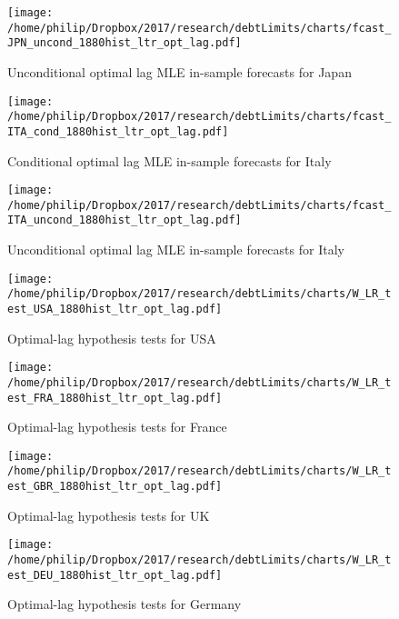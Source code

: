 \documentclass{article}
\begin{document}
	\begin{figure}[htbp]
	    \centering
		\texttt{[image: /home/philip/Dropbox/2017/research/debtLimits/charts/fcast\_JPN\_uncond\_1880hist\_ltr\_opt\_lag.pdf]}
		\caption{Unconditional optimal lag MLE in-sample forecasts for Japan}
	\end{figure}

	\begin{figure}[htbp]
	    \centering
		\texttt{[image: /home/philip/Dropbox/2017/research/debtLimits/charts/fcast\_ITA\_cond\_1880hist\_ltr\_opt\_lag.pdf]}
		\caption{Conditional optimal lag MLE in-sample forecasts for Italy}
	\end{figure}
	
	\begin{figure}[htbp]
	    \centering
		\texttt{[image: /home/philip/Dropbox/2017/research/debtLimits/charts/fcast\_ITA\_uncond\_1880hist\_ltr\_opt\_lag.pdf]}
		\caption{Unconditional optimal lag MLE in-sample forecasts for Italy}
	\end{figure}




	\newpage

	\begin{figure}[htbp]
	    \centering
		\texttt{[image: /home/philip/Dropbox/2017/research/debtLimits/charts/W\_LR\_test\_USA\_1880hist\_ltr\_opt\_lag.pdf]}
		\caption{Optimal-lag hypothesis tests for USA}
	\end{figure}
	
	\begin{figure}[htbp]
	    \centering
		\texttt{[image: /home/philip/Dropbox/2017/research/debtLimits/charts/W\_LR\_test\_FRA\_1880hist\_ltr\_opt\_lag.pdf]}
		\caption{Optimal-lag hypothesis tests for France}
	\end{figure}
	
	\begin{figure}[htbp]
	    \centering
		\texttt{[image: /home/philip/Dropbox/2017/research/debtLimits/charts/W\_LR\_test\_GBR\_1880hist\_ltr\_opt\_lag.pdf]}
		\caption{Optimal-lag hypothesis tests for UK}
	\end{figure}

	\begin{figure}[htbp]
	    \centering
		\texttt{[image: /home/philip/Dropbox/2017/research/debtLimits/charts/W\_LR\_test\_DEU\_1880hist\_ltr\_opt\_lag.pdf]}
		\caption{Optimal-lag hypothesis tests for Germany}
	\end{figure}
\end{document}
